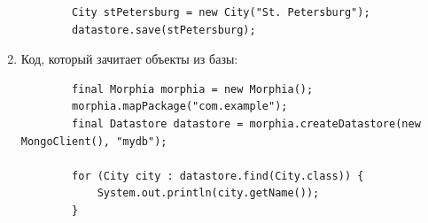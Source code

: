 \documentclass[a5paper]{article}
\begin{document}
\begin{enumerate}
\begin{verbatim}
        City stPetersburg = new City("St. Petersburg");
        datastore.save(stPetersburg);
	\end{verbatim}
	\item Код, который зачитает объекты из базы:
	\begin{verbatim}
        final Morphia morphia = new Morphia();
        morphia.mapPackage("com.example");
        final Datastore datastore = morphia.createDatastore(new MongoClient(), "mydb");

        for (City city : datastore.find(City.class)) {
            System.out.println(city.getName());
        }
	\end{verbatim}
\end{enumerate}
\end{document}
